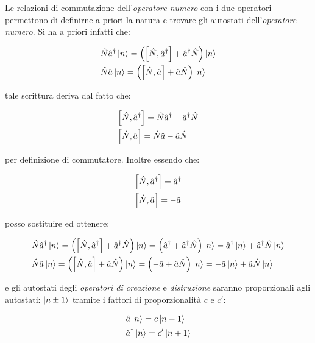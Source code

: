 	Le relazioni di commutazione dell'\textit{operatore numero} con i due operatori permettono di definirne a priori la natura e trovare gli autostati dell'\textit{operatore numero}. Si ha a priori infatti che:

\begin{align*}
	& \hat{N}\hat{a}^{\dagger} \ket{n} = \qty(\qty[\hat{N}, \hat{a}^{\dagger}] + \hat{a}^{\dagger}\hat{N}) \ket{n} \\
	& \hat{N} \hat{a} \ket{n} = \qty(\qty[\hat{N}, \hat{a}] + \hat{a}\hat{N}) \ket{n}
\end{align*}

	tale scrittura deriva dal fatto che:
	
\begin{align*}
	&\qty[\hat{N}, \hat{a}^{\dagger}] = \hat{N}\hat{a}^{\dagger} - \hat{a}^{\dagger} \hat{N} \\
	& \qty[\hat{N}, \hat{a}] = \hat{N}\hat{a} - \hat{a}\hat{N} 
\end{align*}

	per definizione di commutatore. Inoltre essendo che:

\begin{align*}
	&\qty[\hat{N}, \hat{a}^{\dagger}] = \hat{a}^{\dagger} \\
	& \qty[\hat{N}, \hat{a}] =  - \hat{a}
\end{align*}

	posso sostituire ed ottenere:

\begin{align*}
	& \hat{N}\hat{a}^{\dagger} \ket{n} = \qty(\qty[\hat{N}, \hat{a}^{\dagger}] + \hat{a}^{\dagger}\hat{N}) \ket{n} =  \qty( \hat{a}^{\dagger} + \hat{a}^{\dagger}\hat{N}) \ket{n} = \hat{a}^{\dagger} \ket{n} + \hat{a}^{\dagger} \hat{N} \ket{n}\\
	& \hat{N} \hat{a} \ket{n} = \qty(\qty[\hat{N}, \hat{a}] + \hat{a}\hat{N}) \ket{n} =  \qty( - \hat{a} + \hat{a}\hat{N}) \ket{n} = - \hat{a} \ket{n} + \hat{a}\hat{N} \ket{n}
\end{align*}
	
	e gli autostati degli \textit{operatori di creazione} e \textit{distruzione} saranno proporzionali agli autostati: $\ket{n \pm 1}$ tramite i fattori di proporzionalità $c$ e $c'$:
	
\begin{align*}
	& \hat{a} \ket{n} = c \ket{n-1} \\
	& \hat{a}^{\dagger} \ket{n} = c' \ket{n+1}
\end{align*}
	
